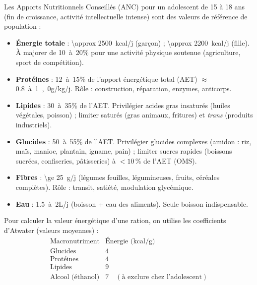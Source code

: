 \documentclass[11pt]{article}
\newcommand{\cle}[1]{{\popxbold\color{popdark}#1}}
\begin{document}
\begin{definition}
Les \cle{Apports Nutritionnels Conseillés (ANC)} pour un adolescent de 15 à 18 ans (fin de croissance, activité intellectuelle intense) sont des valeurs de référence de population :
\begin{itemize}
\item \textbf{Énergie totale} : \SI{\approx 2500}{kcal/j} (garçon) ; \SI{\approx 2200}{kcal/j} (fille). À majorer de \SI{10}{à 20}{\%} pour une activité physique soutenue (agriculture, sport de compétition).
\item \textbf{Protéines} : \SI{12}{à 15}{\%} de l'apport énergétique total (AET) $\approx$ \SI{0,8}{à 1,0}{g/kg/j}. Rôle : construction, réparation, enzymes, anticorps.
\item \textbf{Lipides} : \SI{30}{à 35}{\%} de l'AET. Privilégier acides gras insaturés (huiles végétales, poisson) ; limiter saturés (gras animaux, fritures) et \emph{trans} (produits industriels).
\item \textbf{Glucides} : \SI{50}{à 55}{\%} de l'AET. Privilégier \cle{glucides complexes} (amidon : riz, maïs, manioc, plantain, igname, pain) ; limiter \cle{sucres rapides} (boissons sucrées, confiseries, pâtisseries) à $< 10\,\%$ de l'AET (OMS).
\item \textbf{Fibres} : \SI{\ge 25}{g/j} (légumes feuilles, légumineuses, fruits, céréales complètes). Rôle : transit, satiété, modulation glycémique.
\item \textbf{Eau} : \SI{1,5}{à 2}{L/j} (boisson + eau des aliments). Seule boisson indispensable.
\end{itemize}
\end{definition}

\begin{propriete}
Pour calculer la valeur énergétique d'une ration, on utilise les coefficients d'Atwater (valeurs moyennes) :
\[
\begin{array}{c|c}
\text{Macronutriment} & \text{Énergie (kcal/g)} \\ \hline
\text{Glucides} & 4 \\
\text{Protéines} & 4 \\
\text{Lipides} & 9 \\
\text{Alcool (éthanol)} & 7 \quad (\text{à exclure chez l'adolescent})
\end{array}
\]
\end{propriete}
\end{document}
